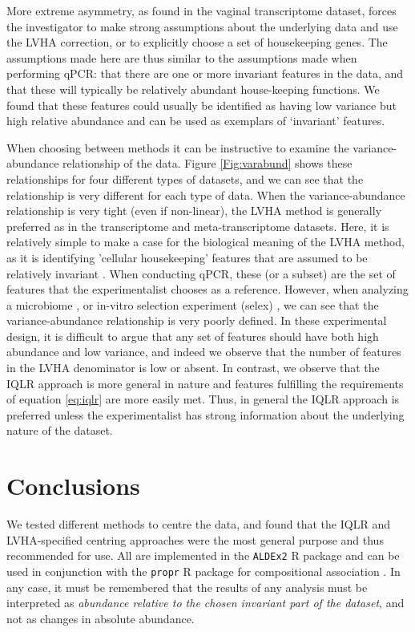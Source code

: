 \documentclass[graybox]{svmult}
\begin{document}
More extreme asymmetry, as found in the vaginal transcriptome dataset, forces the investigator to make strong assumptions about the underlying data and use the LVHA correction, or to explicitly choose a set of housekeeping genes. The assumptions made here are thus similar to the assumptions made when performing qPCR: that there are one or more invariant features in the data, and that these will typically be relatively abundant house-keeping functions. We found that these features could usually be identified as having low variance but high relative abundance and can be used as exemplars of `invariant' features. 

When choosing between methods it can be instructive to examine the variance-abundance relationship of the data. Figure \ref{Fig:varabund} shows these relationships for four different types of datasets, and we can see that the relationship is very different for each type of data. When the variance-abundance relationship is very tight (even if non-linear), the LVHA method is generally preferred as in the transcriptome \cite{Gierlinski:2015aa} and meta-transcriptome datasets. Here, it is relatively simple to make a case for the biological meaning of the LVHA method, as it is identifying 'cellular housekeeping' features that are assumed to be relatively invariant \cite{Scott:2010}. When conducting qPCR, these (or a subset) are the set of features that the experimentalist chooses as a reference. However, when analyzing a microbiome \cite{bian:2017}, or in-vitro selection experiment (selex) \cite{mcmurrough:2014}, we can see that the variance-abundance relationship is very poorly defined. In these experimental design, it is difficult to argue that any set of features should have both high abundance and low variance, and indeed we observe that the number of features in the LVHA denominator is low or absent. In contrast, we observe that the IQLR approach is more general in nature and features fulfilling the requirements of equation \ref{eq:iqlr} are more easily met. Thus, in general the IQLR approach is preferred unless the experimentalist has strong information about the underlying nature of the dataset. 

 
\section*{Conclusions}
We tested  different methods to  centre the data, and found that the IQLR and LVHA-specified centring approaches were the most general purpose and thus recommended for use. All are implemented in the \texttt{ALDEx2} R package \cite{fernandes:2014} and can be used in conjunction with the \texttt{propr} R package for compositional association \cite{Quinn:2017}.   In any case, it must be remembered that the results of any analysis must be interpreted as \textit{abundance relative to the chosen invariant part of the dataset}, and not as changes in absolute abundance.
\end{document}
